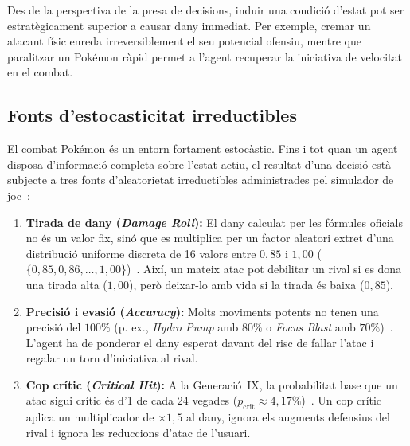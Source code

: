 Des de la perspectiva de la presa de decisions, induir una condició d'estat pot ser estratègicament superior a causar dany immediat. Per exemple, cremar un atacant físic enreda irreversiblement el seu potencial ofensiu, mentre que paralitzar un Pokémon ràpid permet a l'agent recuperar la iniciativa de velocitat en el combat.

\subsection{Fonts d'estocasticitat irreductibles}
\label{subsec:estocasticitat}

El combat Pokémon és un entorn fortament estocàstic. Fins i tot quan un agent disposa d'informació completa sobre l'estat actiu, el resultat d'una decisió està subjecte a tres fonts d'aleatorietat irreductibles administrades pel simulador de joc~\cite{smogon_damage,smogon_metagame,bulbapedia}:

\begin{enumerate}
    \item \textbf{Tirada de dany (\emph{Damage Roll}):} El dany calculat per les fórmules oficials no és un valor fix, sinó que es multiplica per un factor aleatori extret d'una distribució uniforme discreta de 16 valors entre $0{,}85$ i $1{,}00$ ($\{0{,}85, 0{,}86, \dots, 1{,}00\}$)~\cite{smogon_damage}. Així, un mateix atac pot debilitar un rival si es dona una tirada alta ($1{,}00$), però deixar-lo amb vida si la tirada és baixa ($0{,}85$).
    \item \textbf{Precisió i evasió (\emph{Accuracy}):} Molts moviments potents no tenen una precisió del $100\%$ (p. ex., \emph{Hydro Pump} amb $80\%$ o \emph{Focus Blast} amb $70\%$)~\cite{bulbapedia}. L'agent ha de ponderar el dany esperat davant del risc de fallar l'atac i regalar un torn d'iniciativa al rival.
    \item \textbf{Cop crític (\emph{Critical Hit}):} A la Generació~IX, la probabilitat base que un atac sigui crític és d'1 de cada 24 vegades ($p_{\mathrm{crit}} \approx 4{,}17\%$)~\cite{bulbapedia,smogon_damage}. Un cop crític aplica un multiplicador de $\times 1{,}5$ al dany, ignora els augments defensius del rival i ignora les reduccions d'atac de l'usuari.
\end{enumerate}

